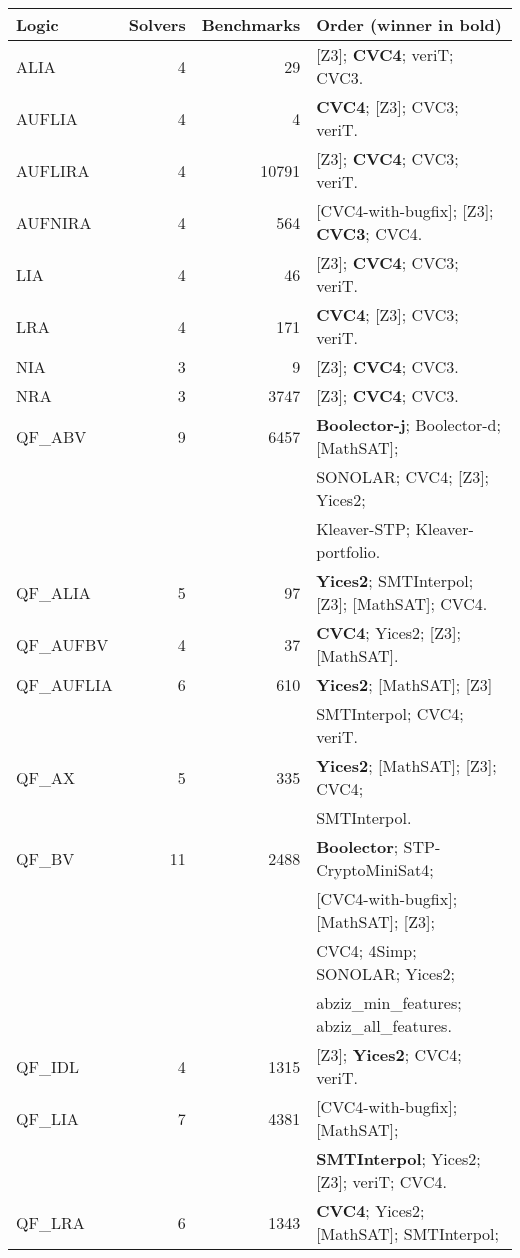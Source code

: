 \documentclass[twosize,11pt]{article}
\begin{document}
\begin{table}
\centering
\newcommand{\win}[1]{\textbf{#1}}
\begin{tabular}{|l|r|r|l|}
\hline
Logic &	Solvers &	Benchmarks & Order (winner in bold) \\
\hline
ALIA & 		4 & 	29  & 	[Z3]; \win{CVC4}; veriT; CVC3. \\
AUFLIA & 	4 & 	4   & 	\win{CVC4}; [Z3]; CVC3; veriT. \\
AUFLIRA & 	4 & 	10791 & 	[Z3]; \win{CVC4}; CVC3; veriT. \\
AUFNIRA & 	4 & 	564 & 	[CVC4-with-bugfix]; [Z3]; \win{CVC3}; CVC4. \\
LIA & 		4 & 	46 & 	[Z3]; \win{CVC4}; CVC3; veriT. \\
LRA & 		4 & 	171 & 	\win{CVC4}; [Z3]; CVC3; veriT. \\
NIA & 		3 & 	9 &  	[Z3]; \win{CVC4}; CVC3. \\
NRA & 		3 & 	3747 & 	[Z3]; \win{CVC4}; CVC3. \\
QF\_ABV & 	9 & 	6457 & \win{Boolector-j}; Boolector-d; [MathSAT]; \\
& & & SONOLAR; CVC4; [Z3]; Yices2; \\
& & & Kleaver-STP; Kleaver-portfolio. \\
QF\_ALIA & 	5 & 	97 & \win{Yices2}; SMTInterpol; [Z3]; [MathSAT]; CVC4. \\
QF\_AUFBV & 	4 & 	37 & \win{CVC4}; Yices2; [Z3]; [MathSAT]. \\
QF\_AUFLIA & 	6 & 	610 & \win{Yices2}; [MathSAT]; [Z3] \\
& & & SMTInterpol; CVC4; veriT. \\
QF\_AX & 	5 & 	335 & \win{Yices2}; [MathSAT]; [Z3]; CVC4; \\
& & & SMTInterpol. \\
QF\_BV & 	11 & 	2488 & \win{Boolector}; STP-CryptoMiniSat4; \\
& & & [CVC4-with-bugfix]; [MathSAT]; [Z3]; \\
& & & CVC4; 4Simp; SONOLAR; Yices2; \\
& & & abziz\_min\_features; abziz\_all\_features. \\
QF\_IDL & 	4 & 	1315 & 	[Z3]; \win{Yices2}; CVC4; veriT. \\
QF\_LIA & 	7 & 	4381 & 	[CVC4-with-bugfix]; [MathSAT]; \\
& & & \win{SMTInterpol}; Yices2; [Z3]; veriT; CVC4. \\
QF\_LRA & 	6 & 	1343  & \win{CVC4}; Yices2; [MathSAT]; SMTInterpol; \\

\end{tabular}
\end{table}
\end{document}
